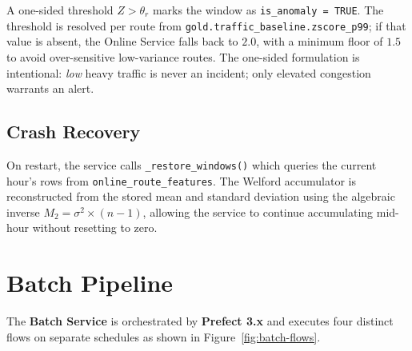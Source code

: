 A one-sided threshold $Z > \theta_r$ marks the window as
\texttt{is\_anomaly = TRUE}. The threshold is resolved per route from
\texttt{gold.traffic\_baseline.zscore\_p99}; if that value is absent, the
Online Service falls back to $2.0$, with a minimum floor of $1.5$ to avoid
over-sensitive low-variance routes. The one-sided formulation is intentional:
\textit{low} heavy traffic is never an incident; only elevated congestion
warrants an alert.

\subsection{Crash Recovery}

On restart, the service calls \texttt{\_restore\_windows()} which queries the
current hour's rows from \texttt{online\_route\_features}. The Welford
accumulator is reconstructed from the stored mean and standard deviation using
the algebraic inverse $M_2 = \sigma^2 \times (n - 1)$, allowing the service to
continue accumulating mid-hour without resetting to zero.

\section{Batch Pipeline}
\label{sec:impl-batch}

The \textbf{Batch Service} is orchestrated by \textbf{Prefect 3.x} and
executes four distinct flows on separate schedules as shown in
Figure~\ref{fig:batch-flows}.

